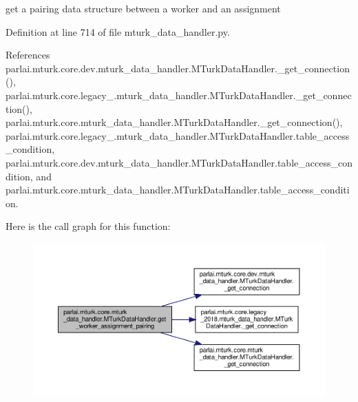 \begin{DoxyVerb}get a pairing data structure between a worker and an assignment\end{DoxyVerb}
 

Definition at line 714 of file mturk\+\_\+data\+\_\+handler.\+py.



References parlai.\+mturk.\+core.\+dev.\+mturk\+\_\+data\+\_\+handler.\+M\+Turk\+Data\+Handler.\+\_\+get\+\_\+connection(), parlai.\+mturk.\+core.\+legacy\+\_.\+mturk\+\_\+data\+\_\+handler.\+M\+Turk\+Data\+Handler.\+\_\+get\+\_\+connection(), parlai.\+mturk.\+core.\+mturk\+\_\+data\+\_\+handler.\+M\+Turk\+Data\+Handler.\+\_\+get\+\_\+connection(), parlai.\+mturk.\+core.\+legacy\+\_.\+mturk\+\_\+data\+\_\+handler.\+M\+Turk\+Data\+Handler.\+table\+\_\+access\+\_\+condition, parlai.\+mturk.\+core.\+dev.\+mturk\+\_\+data\+\_\+handler.\+M\+Turk\+Data\+Handler.\+table\+\_\+access\+\_\+condition, and parlai.\+mturk.\+core.\+mturk\+\_\+data\+\_\+handler.\+M\+Turk\+Data\+Handler.\+table\+\_\+access\+\_\+condition.

Here is the call graph for this function\+:
\nopagebreak
\begin{figure}[H]
\begin{center}
\leavevmode
\includegraphics[width=350pt]{classparlai_1_1mturk_1_1core_1_1mturk__data__handler_1_1MTurkDataHandler_a91ba12c1bce3f3af8b760eaf1384a8b9_cgraph}
\end{center}
\end{figure}
\mbox{\label{classparlai_1_1mturk_1_1core_1_1mturk__data__handler_1_1MTurkDataHandler_a45c012ee9fa36a52f9286ccc3ab1be3a}} 

